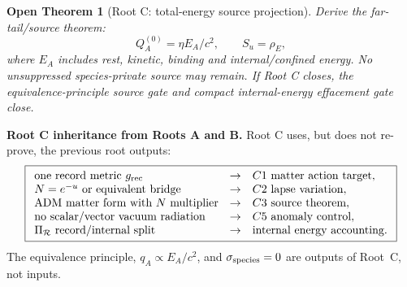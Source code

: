 \documentclass[11pt]{article}
\newtheorem{openthm}{Open Theorem}
\begin{document}
\begin{openthm}[Root C: total-energy source projection]
Derive the far-tail/source theorem:
\[
\boxed{
Q_A^{(0)}=\eta E_A/c^2,
\qquad
S_u=\rho_E,
}
\]
where \(E_A\) includes rest, kinetic, binding and internal/confined energy.
No unsuppressed species-private source may remain.  If Root C closes, the
equivalence-principle source gate and compact internal-energy effacement gate
close.
\end{openthm}

\medskip\noindent\textbf{Root C inheritance from Roots A and B.}
Root C uses, but does not re-prove, the previous root outputs:
\[
\boxed{
\begin{array}{lll}
\text{one record metric }g_{\rm rec} &\to& C1\text{ matter action target},\\
N=e^{-u}\text{ or equivalent bridge} &\to& C2\text{ lapse variation},\\
\text{ADM matter form with }N\text{ multiplier} &\to& C3\text{ source theorem},\\
\text{no scalar/vector vacuum radiation} &\to& C5\text{ anomaly control},\\
\Pi_{\mathcal R}\text{ record/internal split} &\to& \text{internal energy accounting}.
\end{array}
}
\]
The equivalence principle, \(q_A\propto E_A/c^2\), and
\(\sigma_{\rm species}=0\) are outputs of Root~C, not inputs.
\end{document}
